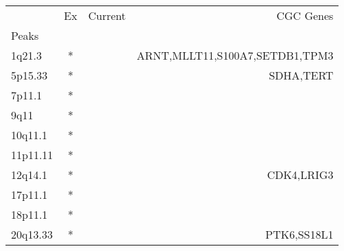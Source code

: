 \begin{tabular}{lccr}
\toprule
{} & Ex & Current &                       CGC Genes \\
Peaks    &    &         &                                 \\
\midrule
1q21.3   &  * &         &  ARNT,MLLT11,S100A7,SETDB1,TPM3 \\
5p15.33  &  * &         &                       SDHA,TERT \\
7p11.1   &  * &         &                                 \\
9q11     &  * &         &                                 \\
10q11.1  &  * &         &                                 \\
11p11.11 &  * &         &                                 \\
12q14.1  &  * &         &                      CDK4,LRIG3 \\
17p11.1  &  * &         &                                 \\
18p11.1  &  * &         &                                 \\
20q13.33 &  * &         &                     PTK6,SS18L1 \\
\bottomrule
\end{tabular}
